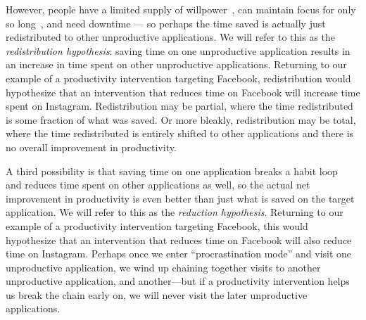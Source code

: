 However, people have a limited supply of willpower~\cite{baumeister1998ego}, can maintain focus for only so long~\cite{jin2009self,dabbish2011keep,mark2016email}, and need downtime --- so perhaps the time saved is actually just redistributed to other unproductive applications. We will refer to this as the \textit{redistribution hypothesis}: saving time on one unproductive application results in an increase in time spent on other unproductive applications. Returning to our example of a productivity intervention targeting Facebook, redistribution would hypothesize that an intervention that reduces time on Facebook will increase time spent on Instagram.
Redistribution may be partial, where the time redistributed is some fraction of what was saved. Or more bleakly, redistribution may be total, where the time redistributed is entirely shifted to other applications and there is no overall improvement in productivity.

A third possibility is that saving time on one application breaks a habit loop~\cite{duhigg2012power} and reduces time spent on other applications as well, so the actual net improvement in productivity is even better than just what is saved on the target application. We will refer to this as the \textit{reduction hypothesis}. Returning to our example of a productivity intervention targeting Facebook, this would hypothesize that an intervention that reduces time on Facebook will also reduce time on Instagram. Perhaps once we enter ``procrastination mode'' and visit one unproductive application, we wind up chaining together visits to another unproductive application, and another---but if a productivity intervention helps us break the chain early on, we will never visit the later unproductive applications.


